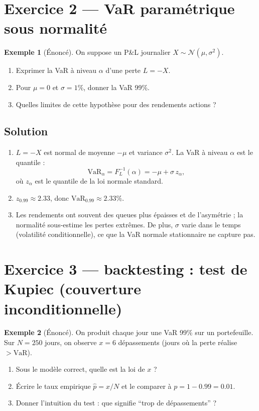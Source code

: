 \documentclass[11pt,a4paper]{report}
\newcommand{\1}{\mathbbm{1}}
\newcommand{\Normal}{\mathcal{N}}
\newcommand{\VaR}{\mathrm{VaR}}
\theoremstyle{definition}
\newtheorem{example}{Exemple}[chapter]
\theoremstyle{plain}
\theoremstyle{remark}
\begin{document}
\section{Exercice 2 --- VaR paramétrique sous normalité}
\begin{example}[Énoncé]
On suppose un P\&L journalier $X\sim\Normal(\mu,\sigma^2)$.
\begin{enumerate}[label=\alph*)]
  \item Exprimer la VaR à niveau $\alpha$ d'une perte $L=-X$.
  \item Pour $\mu=0$ et $\sigma=1\%$, donner la VaR 99\%.
  \item Quelles limites de cette hypothèse pour des rendements actions ?
\end{enumerate}
\end{example}

\subsection*{Solution}
\begin{enumerate}[label=\alph*)]
  \item $L=-X$ est normal de moyenne $-\mu$ et variance $\sigma^2$.
  La VaR à niveau $\alpha$ est le quantile :
  \[\VaR_{\alpha}=F_L^{-1}(\alpha)=-\mu+\sigma\,z_{\alpha},\]
  où $z_{\alpha}$ est le quantile de la loi normale standard.
  \item $z_{0.99}\approx 2.33$, donc $\VaR_{0.99}\approx 2.33\%$.
  \item Les rendements ont souvent des queues plus épaisses et de l'asymétrie ; la normalité sous-estime les pertes extrêmes.
  De plus, $\sigma$ varie dans le temps (volatilité conditionnelle), ce que la VaR normale stationnaire ne capture pas.
\end{enumerate}

\section{Exercice 3 --- backtesting : test de Kupiec (couverture inconditionnelle)}
\begin{example}[Énoncé]
On produit chaque jour une VaR 99\% sur un portefeuille.
Sur $N=250$ jours, on observe $x=6$ dépassements (jours où la perte réalise $>\VaR$).
\begin{enumerate}[label=\alph*)]
  \item Sous le modèle correct, quelle est la loi de $x$ ?
  \item Écrire le taux empirique $\hat{p}=x/N$ et le comparer à $p=1-0.99=0.01$.
  \item Donner l'intuition du test : que signifie ``trop de dépassements'' ?
\end{enumerate}
\end{example}
\end{document}
